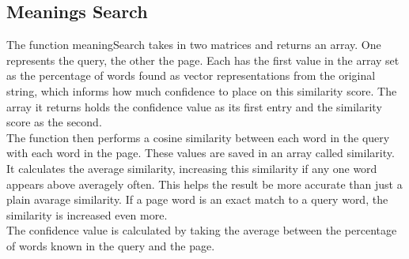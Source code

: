 \subsection{Meanings Search}
The function meaningSearch takes in two matrices and returns an array. One represents the query, the other the page. Each has the first value in the array set as the percentage of words found as vector representations from the original string, which informs how much confidence to place on this similarity score. The array it returns holds the confidence value as its first entry and the similarity score as the second.\\

The function then performs a cosine similarity between each word in the query with each word in the page. These values are saved in an array called similarity. It calculates the average similarity, increasing this similarity if any one word appears above averagely often. This helps the result be more accurate than just a plain avarage similarity. If a page word is an exact match to a query word, the similarity is increased even more.\\
The confidence value is calculated by taking the average between the percentage of words known in the query and the page.  
